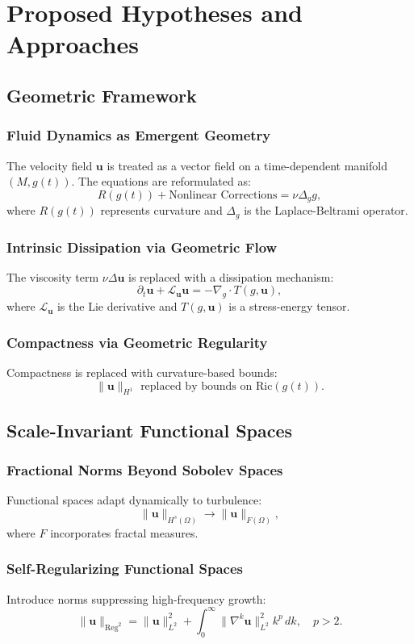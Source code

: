 \section{Proposed Hypotheses and Approaches}
\subsection{Geometric Framework}
\subsubsection{Fluid Dynamics as Emergent Geometry}
The velocity field $\mathbf{u}$ is treated as a vector field on a time-dependent manifold $(M, g(t))$. The equations are reformulated as:
\[
R(g(t)) + \text{Nonlinear Corrections} = \nu \Delta_g g,
\]
where $R(g(t))$ represents curvature and $\Delta_g$ is the Laplace-Beltrami operator.

\subsubsection{Intrinsic Dissipation via Geometric Flow}
The viscosity term $\nu \Delta \mathbf{u}$ is replaced with a dissipation mechanism:
\[
\partial_t \mathbf{u} + \mathcal{L}_\mathbf{u} \mathbf{u} = -\nabla_g \cdot T(g, \mathbf{u}),
\]
where $\mathcal{L}_\mathbf{u}$ is the Lie derivative and $T(g, \mathbf{u})$ is a stress-energy tensor.

\subsubsection{Compactness via Geometric Regularity}
Compactness is replaced with curvature-based bounds:
\[
\|\mathbf{u}\|_{H^1} \text{ replaced by bounds on } \text{Ric}(g(t)).
\]

\subsection{Scale-Invariant Functional Spaces}
\subsubsection{Fractional Norms Beyond Sobolev Spaces}
Functional spaces adapt dynamically to turbulence:
\[
\|\mathbf{u}\|_{H^s(\Omega)} \to \|\mathbf{u}\|_{F(\Omega)},
\]
where $F$ incorporates fractal measures.

\subsubsection{Self-Regularizing Functional Spaces}
Introduce norms suppressing high-frequency growth:
\[
\|\mathbf{u}\|_{\text{Reg}^2} = \|\mathbf{u}\|_{L^2}^2 + \int_0^\infty \|\nabla^k \mathbf{u}\|_{L^2}^2 k^p \, dk, \quad p > 2.
\]

